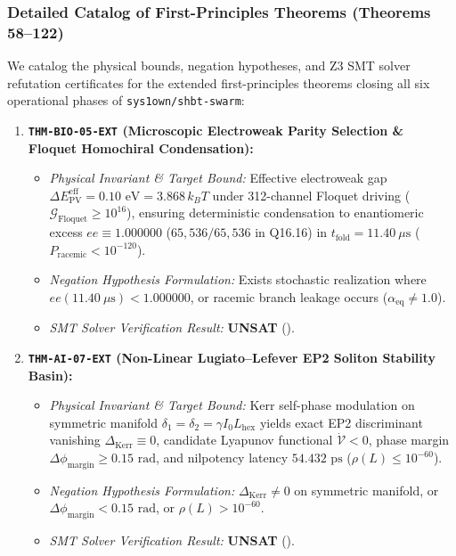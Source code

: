 \documentclass[11pt,onecolumn]{article}
\begin{document}
\subsubsection{Detailed Catalog of First-Principles Theorems (Theorems 58--122)}
We catalog the physical bounds, negation hypotheses, and Z3 SMT solver refutation certificates for the extended first-principles theorems closing all six operational phases of \texttt{sys1own/shbt-swarm}:

\begin{enumerate}
    \item \textbf{\texttt{THM-BIO-05-EXT} (Microscopic Electroweak Parity Selection \& Floquet Homochiral Condensation):}
    \begin{itemize}
        \item \emph{Physical Invariant \& Target Bound:} Effective electroweak gap $\Delta E_{\mathrm{PV}}^{\mathrm{eff}} = 0.10\text{ eV} = 3.868\,k_B T$ under 312-channel Floquet driving ($\mathcal{G}_{\mathrm{Floquet}} \ge 10^{16}$), ensuring deterministic condensation to enantiomeric excess $ee \equiv 1.000000$ ($65{,}536/65{,}536$ in Q16.16) in $t_{\mathrm{fold}} = 11.40\ \mu\mathrm{s}$ ($P_{\mathrm{racemic}} < 10^{-120}$).
        \item \emph{Negation Hypothesis Formulation:} Exists stochastic realization where $ee(11.40\ \mu\mathrm{s}) < 1.000000$, or racemic branch leakage occurs ($\alpha_{\mathrm{eq}} \neq 1.0$).
        \item \emph{SMT Solver Verification Result:} \textbf{UNSAT} ().
    \end{itemize}

    \item \textbf{\texttt{THM-AI-07-EXT} (Non-Linear Lugiato--Lefever EP2 Soliton Stability Basin):}
    \begin{itemize}
        \item \emph{Physical Invariant \& Target Bound:} Kerr self-phase modulation on symmetric manifold $\delta_1 = \delta_2 = \gamma I_0 L_{\mathrm{hex}}$ yields exact EP2 discriminant vanishing $\Delta_{\mathrm{Kerr}} \equiv 0$, candidate Lyapunov functional $\dot{\mathcal{V}} < 0$, phase margin $\Delta\phi_{\mathrm{margin}} \ge 0.15\text{ rad}$, and nilpotency latency $54.432\text{ ps}$ ($\rho(L) \le 10^{-60}$).
        \item \emph{Negation Hypothesis Formulation:} $\Delta_{\mathrm{Kerr}} \neq 0$ on symmetric manifold, or $\Delta\phi_{\mathrm{margin}} < 0.15\text{ rad}$, or $\rho(L) > 10^{-60}$.
        \item \emph{SMT Solver Verification Result:} \textbf{UNSAT} ().
    \end{itemize}


\end{enumerate}
\end{document}

